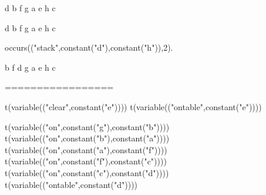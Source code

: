  



 d
 b
 f    
 g   a   e   h   c 


                             d
 b
 f    
 g   a   e   h   c 

occurs(("stack",constant("d"),constant("h")),2).

                             
 b
 f              d
 g   a   e   h   c 

=================

 t(variable(("clear",constant("e")))) 
 t(variable(("ontable",constant("e")))) 
 
 t(variable(("on",constant("g"),constant("b")))) 
 t(variable(("on",constant("b"),constant("a")))) 
 t(variable(("on",constant("a"),constant("f")))) 
 t(variable(("on",constant("f"),constant("c")))) 
 t(variable(("on",constant("c"),constant("d"))))
 t(variable(("ontable",constant("d")))) 
 
 


